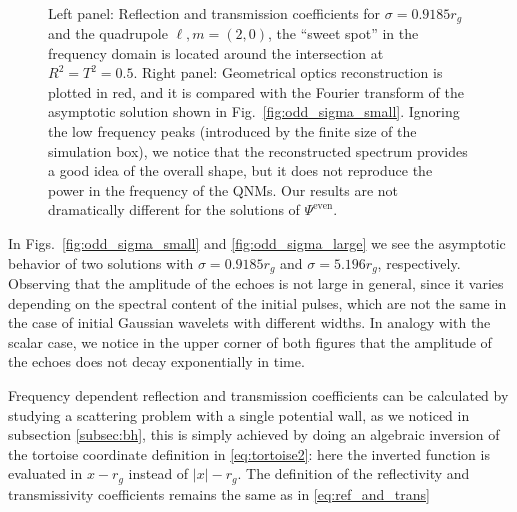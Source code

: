 \documentclass[article,aps,nofootinbib,twocolumn,superscriptaddress]{revtex4-1}
\begin{document}
\begin{figure}[t!]
\centering
{} \,
\caption{\label{fig:RT_reconst} Left panel: Reflection and transmission coefficients for $\sigma=0.9185r_g$ and the quadrupole $\ell,m=(2,0)$, the ``sweet spot'' in the frequency domain is located around the intersection at $R^2=T^2=0.5$. Right panel: Geometrical optics reconstruction is plotted in red, and it is compared with the Fourier transform of the asymptotic solution shown in Fig.~\ref{fig:odd_sigma_small}. Ignoring the low frequency peaks (introduced by the finite size of the simulation box), we notice that the reconstructed spectrum provides a good idea of the overall shape, but it does not reproduce the power in the frequency of the QNMs. Our results are not dramatically different for the solutions of $\Psi^{\mathrm{even}}$.} 
\end{figure}

In Figs.~\ref{fig:odd_sigma_small} and \ref{fig:odd_sigma_large} we see the asymptotic behavior of two solutions with $\sigma=0.9185r_g$ and $\sigma=5.196r_g$, respectively. Observing that the amplitude of the echoes is not large in general, since it varies depending on the spectral content of the initial pulses, which are not the same in the case of initial Gaussian wavelets with different widths. In analogy with the scalar case, we notice in the upper corner of both figures that the amplitude of the echoes does not decay exponentially in time.
\par
Frequency dependent reflection and transmission coefficients can be calculated by studying a scattering problem with a single potential wall, as we noticed in subsection \ref{subsec:bh}, this is simply achieved by doing an algebraic inversion of the tortoise coordinate definition in \eqref{eq:tortoise2}: here the inverted function is evaluated in $x-r_g$ instead of $|x|-r_g$. The definition of the reflectivity and transmissivity coefficients remains the same as in \eqref{eq:ref_and_trans}
\end{document}
